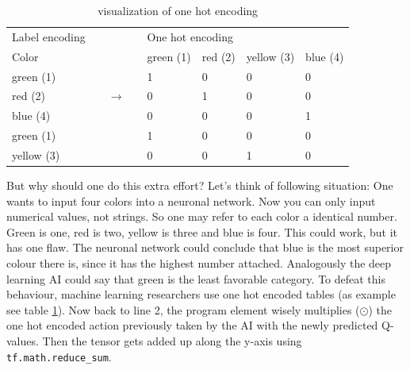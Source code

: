 \documentclass[12pt]{article}
\begin{document}
\begin{centering}
\begin{table}[H]
\caption{visualization of one hot encoding}
\label{tab:oneHot}
\begin{tabular}{lllllllll}
Label encoding               &  &  &  &                       & \multicolumn{4}{l}{One hot encoding}                                                              \\ \cline{1-1} \cline{6-9} 
\multicolumn{1}{|l|}{Color} &
   &
   &
   &
  \multicolumn{1}{l|}{} &
  \multicolumn{1}{l|}{green (1)} &
  \multicolumn{1}{l|}{red (2)} &
  \multicolumn{1}{l|}{yellow (3)} &
  \multicolumn{1}{l|}{blue (4)} \\ \cline{1-1} \cline{6-9} 
\multicolumn{1}{|l|}{green (1)}  &  &  &  & \multicolumn{1}{l|}{} & \multicolumn{1}{l|}{1} & \multicolumn{1}{l|}{0} & \multicolumn{1}{l|}{0} & \multicolumn{1}{l|}{0} \\ \cline{1-1} \cline{6-9} 
\multicolumn{1}{|l|}{red (2)} &
   &
  \multicolumn{2}{l}{$\rightarrow$} &
  \multicolumn{1}{l|}{} &
  \multicolumn{1}{l|}{0} &
  \multicolumn{1}{l|}{1} &
  \multicolumn{1}{l|}{0} &
  \multicolumn{1}{l|}{0} \\ \cline{1-1} \cline{6-9} 
\multicolumn{1}{|l|}{blue (4)}   &  &  &  & \multicolumn{1}{l|}{} & \multicolumn{1}{l|}{0} & \multicolumn{1}{l|}{0} & \multicolumn{1}{l|}{0} & \multicolumn{1}{l|}{1} \\ \cline{1-1} \cline{6-9} 
\multicolumn{1}{|l|}{green (1)}  &  &  &  & \multicolumn{1}{l|}{} & \multicolumn{1}{l|}{1} & \multicolumn{1}{l|}{0} & \multicolumn{1}{l|}{0} & \multicolumn{1}{l|}{0} \\ \cline{1-1} \cline{6-9} 
\multicolumn{1}{|l|}{yellow (3)} &  &  &  & \multicolumn{1}{l|}{} & \multicolumn{1}{l|}{0} & \multicolumn{1}{l|}{0}  & \multicolumn{1}{l|}{1} & \multicolumn{1}{l|}{0} \\ \cline{1-1} \cline{6-9} 
\end{tabular}
\end{table}
\end{centering}
But why should one do this extra effort? Let's think of following situation: One wants to input four colors into a neuronal network. Now you can only input numerical values, not strings. So one may refer to each color a identical number. Green is one, red is two, yellow is three and blue is four. This could work, but it has one flaw. The neuronal network could conclude that blue is the most superior colour there is, since it has the highest number attached. Analogously the deep learning AI could say that green is the least favorable category. To defeat this behaviour, machine learning researchers use one hot encoded tables (as example see table \ref{tab:oneHot}). Now back to line 2, the program element wisely multiplies ($\odot$) the one hot encoded action previously taken by the AI with the newly predicted Q-values. Then the tensor gets added up along the y-axis using \lstinline{tf.math.reduce_sum}. \cite{tf.math.reduce}
\end{document}
